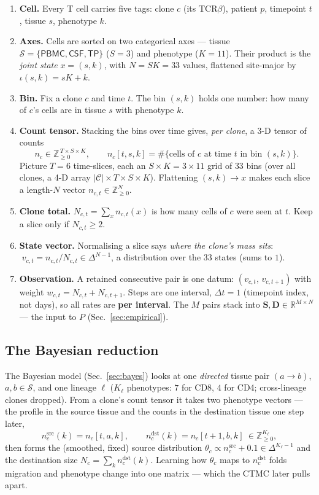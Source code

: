 \documentclass[11pt]{article}
\newcommand{\R}{\mathbb{R}}
\newcommand{\Z}{\mathbb{Z}}
\newcommand{\simplex}[1]{\Delta^{#1}}
\newcommand{\sites}{\mathcal{S}}
\newcommand{\clones}{\mathcal{C}}
\newcommand{\flatidx}{\iota}              %
\newcommand{\ndst}{n^{\mathrm{dst}}}
\newcommand{\nsrc}{n^{\mathrm{src}}}
\begin{document}
\begin{enumerate}\itemsep3pt
\item \textbf{Cell.} Every T cell carries five tags: clone $c$ (its TCR$\beta$),
      patient $p$, timepoint $t$, tissue $s$, phenotype $k$.
\item \textbf{Axes.} Cells are sorted on two categorical axes --- tissue
      $\sites=\{\textsf{PBMC},\textsf{CSF},\textsf{TP}\}$ ($S=3$) and phenotype
      ($K=11$). Their product is the \emph{joint state} $x=(s,k)$, with
      $N=SK=33$ values, flattened site-major by $\flatidx(s,k)=sK+k$.
\item \textbf{Bin.} Fix a clone $c$ and time $t$. The bin $(s,k)$ holds one
      number: how many of $c$'s cells are in tissue $s$ with phenotype $k$.
\item \textbf{Count tensor.} Stacking the bins over time gives, \emph{per
      clone}, a 3-D tensor of counts
      \[
        n_c\in\Z_{\ge0}^{\,T\times S\times K},\qquad
        n_c[t,s,k]=\#\{\text{cells of }c\text{ at time }t\text{ in bin }(s,k)\}.
      \]
      Picture $T=6$ time-slices, each an $S\times K=3\times11$ grid of $33$ bins
      (over all clones, a 4-D array $|\clones|\times T\times S\times K$).
      Flattening $(s,k)\!\to\! x$ makes each slice a length-$N$ vector
      $n_{c,t}\in\Z_{\ge0}^{N}$.
\item \textbf{Clone total.} $N_{c,t}=\sum_x n_{c,t}(x)$ is how many cells of $c$
      were seen at $t$. Keep a slice only if $N_{c,t}\ge2$.
\item \textbf{State vector.} Normalising a slice says \emph{where the clone's
      mass sits}: $\;v_{c,t}=n_{c,t}/N_{c,t}\in\simplex{N-1}$, a distribution
      over the $33$ states (sums to $1$).
\item \textbf{Observation.} A retained consecutive pair is one datum:
      $(v_{c,t},\,v_{c,t+1})$ with weight $w_{c,t}=N_{c,t}+N_{c,t+1}$. Steps are
      one interval, $\Delta t=1$ (timepoint index, not days), so all rates are
      \textbf{per interval}. The $M$ pairs stack into
      $\mathbf{S},\mathbf{D}\in\R^{M\times N}$ --- the input to $P$
      (Sec.~\ref{sec:empirical}).
\end{enumerate}

\subsection{The Bayesian reduction}

The Bayesian model (Sec.~\ref{sec:bayes}) looks at one \emph{directed} tissue
pair $(a\!\to\! b)$, $a,b\in\sites$, and one lineage $\ell$ ($K_\ell$
phenotypes: $7$ for CD8, $4$ for CD4; cross-lineage clones dropped). From a
clone's count tensor it takes two phenotype vectors --- the profile in the
source tissue and the counts in the destination tissue one step later,
\[
  \nsrc_c(k)=n_c[t,a,k],\qquad
  \ndst_c(k)=n_c[t{+}1,b,k]\ \in\Z_{\ge0}^{K_\ell},
\]
then forms the (smoothed, fixed) source distribution
$\theta_c\propto\nsrc_c+0.1\in\simplex{K_\ell-1}$ and the destination size
$N_c=\sum_k\ndst_c(k)$. Learning how $\theta_c$ maps to $\ndst_c$ folds
migration and phenotype change into one matrix --- which the CTMC later pulls
apart.
\end{document}
